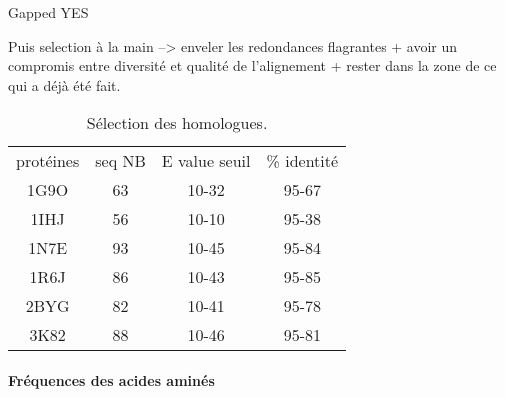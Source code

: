 Gapped YES


Puis selection à la main -->
enveler les redondances flagrantes
 + avoir un compromis entre diversité et qualité de l'alignement
 + rester dans la zone de ce qui a déjà été fait.



    \begin{table}[!htbp]
      \centering

      \begin{tabular}{cccc}

        \toprule
        protéines & seq NB & E value seuil & \% identité \\
        \cmidrule{1-4}
     1G9O  & 63  &    10-32  &  95-67 \\
     1IHJ  & 56  &    10-10  &  95-38 \\
     1N7E  & 93  &    10-45  &  95-84 \\
     1R6J  & 86  &    10-43  &  95-85 \\
     2BYG  & 82  &    10-41  &  95-78 \\
     3K82  & 88  &    10-46  &  95-81 \\


        \bottomrule


      \end{tabular}      
      \caption{Sélection des homologues.}
\label{tab:freq_AA_ALL}      
    \end{table}



    \clearpage

\paragraph{Fréquences des acides aminés}


